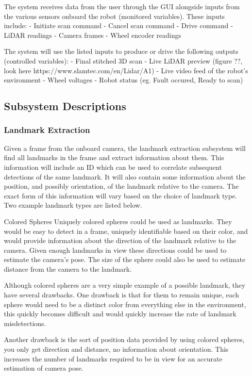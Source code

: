 \documentclass[12pt]{article}
\begin{document}
The system receives data from the user through the GUI alongside inputs from the various sensors onboard the robot (monitored variables). These inputs include:
- Initiate scan command
- Cancel scan command
- Drive command
- LiDAR readings
- Camera frames
- Wheel encoder readings

The system will use the listed inputs to produce or drive the following outputs (controlled variables):
- Final stitched 3D scan
- Live LiDAR preview (figure ??, look here https://www.slamtec.com/en/Lidar/A1)
- Live video feed of the robot's environment
- Wheel voltages
- Robot status (eg. Fault occured, Ready to scan)

\subsection{Subsystem Descriptions}

\subsubsection{Landmark Extraction}
    Given a frame from the onboard camera, the landmark extraction subsystem will find all landmarks in the frame and extract information about them.
    This information will include an ID which can be used to correlate subsequent detections of the same landmark. It will also contain some information about the position, and possibly orientation, of the landmark relative to the camera. The exact form of this information will vary based on the choice of landmark type. Two example landmark types are listed below. 

    Colored Spheres
        Uniquely colored spheres could be used as landmarks. They would be easy to detect in a frame, uniquely identifiable based on their color, and would provide information about the direction of the landmark relative to the camera. Given enough landmarks in view these directions could be used to estimate the camera's pose. The size of the sphere could also be used to estimate distance from the camera to the landmark.

        Although colored spheres are a very simple example of a possible landmark, they have several drawbacks. One drawback is that for them to remain unique, each sphere would need to be a distinct color from everything else in the environment, this quickly becomes difficult and would quickly increase the rate of landmark misdetections.

        Another drawback is the sort of position data provided by using colored spheres, you only get direction and distance, no information about orientation. This increases the number of landmarks required to be in view for an accurate estimation of camera pose. 
\end{document}
